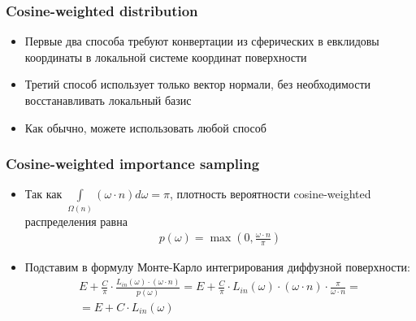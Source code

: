 \documentclass[10pt]{beamer}
\begin{document}
\begin{frame}
\frametitle{Cosine-weighted distribution}
\begin{itemize}
\item Первые два способа требуют конвертации из сферических в евклидовы координаты в локальной системе координат поверхности
\pause
\item Третий способ использует только вектор нормали, без необходимости восстанавливать локальный базис
\pause
\item Как обычно, можете использовать любой способ
\end{itemize}
\end{frame}

\begin{frame}
\frametitle{Cosine-weighted importance sampling}
\begin{itemize}
\item Так как \begin{math}\int\limits_{\Omega(n)} (\omega \cdot n) d\omega = \pi\end{math}, плотность вероятности cosine-weighted распределения равна
\begin{gather*}
p(\omega) = \max\left(0, \frac{\omega\cdot n}{\pi}\right)
\end{gather*}
\pause
\item Подставим в формулу Монте-Карло интегрирования диффузной поверхности:
\begin{gather*}
E + \frac{C}{\pi} \cdot \frac{L_{in}(\omega) \cdot (\omega \cdot n)}{p(\omega)} = E + \frac{C}{\pi} \cdot L_{in}(\omega) \cdot (\omega \cdot n) \cdot \frac{\pi}{\omega \cdot n} = \\
= E + C \cdot L_{in}(\omega)
\end{gather*}
\end{itemize}
\end{frame}
\end{document}
